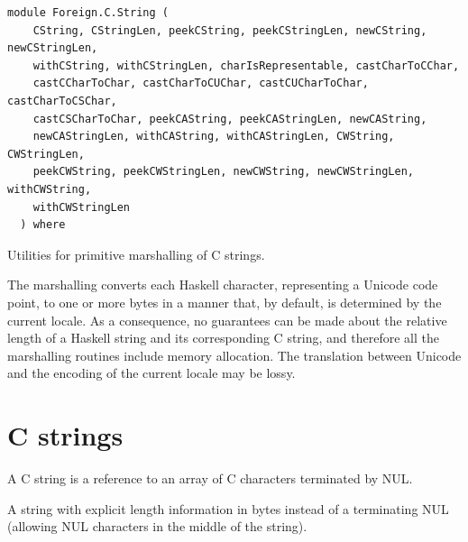 \label{module:Foreign.C.String}
\haddockbeginheader
{\haddockverb\begin{verbatim}
module Foreign.C.String (
    CString, CStringLen, peekCString, peekCStringLen, newCString, newCStringLen,
    withCString, withCStringLen, charIsRepresentable, castCharToCChar,
    castCCharToChar, castCharToCUChar, castCUCharToChar, castCharToCSChar,
    castCSCharToChar, peekCAString, peekCAStringLen, newCAString,
    newCAStringLen, withCAString, withCAStringLen, CWString, CWStringLen,
    peekCWString, peekCWStringLen, newCWString, newCWStringLen, withCWString,
    withCWStringLen
  ) where\end{verbatim}}
\haddockendheader

Utilities for primitive marshalling of C strings.\par
The marshalling converts each Haskell character, representing a Unicode code
 point, to one or more bytes in a manner that, by default, is determined by
 the current locale. As a consequence, no guarantees can be made about the
 relative length of a Haskell string and its corresponding C string, and
 therefore all the marshalling routines include memory allocation. The
 translation between Unicode and the encoding of the current locale may be
 lossy.\par
\section{C strings}
\begin{haddockdesc}
\item[\begin{tabular}{@{}l}
type CString = Ptr CChar
\end{tabular}]
{\haddockbegindoc
A C string is a reference to an array of C characters terminated by NUL.\par}
\end{haddockdesc}
\begin{haddockdesc}
\item[\begin{tabular}{@{}l}
type CStringLen = (Ptr CChar, Int)
\end{tabular}]
{\haddockbegindoc
A string with explicit length information in bytes instead of a
 terminating NUL (allowing NUL characters in the middle of the string).\par}
\end{haddockdesc}
